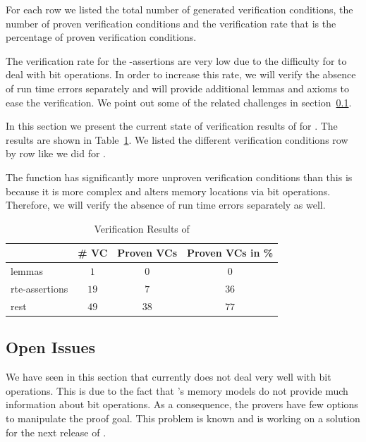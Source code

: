 For each row we listed the total number of generated verification conditions,
the number of proven verification conditions and the verification rate
that is the percentage of proven verification conditions. 

The verification rate for the -assertions are very low 
due to the difficulty for \framac to deal with bit operations.
In order to increase this rate, we will verify the absence
of run time errors separately and will provide additional lemmas and axioms
to ease the verification.
We point out some of the related challenges in section~\ref{issues}.



In this section we present the current state of verification results of 
for \poke.
The results are shown in Table~\ref{tab:results-poke}.
 We listed the different verification conditions 
 row by row like we did for \peek.

The function \poke has significantly more unproven verification conditions than \peek
this is because it is more complex and alters memory locations via bit operations.
Therefore, we will verify the absence of run time errors separately as well.

\begin{table}[hbt]
  \centering
  \begin{tabular}[h]{lccc}
    \toprule
     & \# VC & Proven VCs & Proven VCs in \%\\
    \midrule
    lemmas & $1$ &$0$ & $0$ \\
    rte-assertions&$19$&$7$&$36$\\
    rest &$49$ &$38$&$77$\\
    \bottomrule
  \end{tabular}
  \caption{Verification Results of \poke}
  \label{tab:results-poke}
\end{table}

\clearpage

\subsection{Open Issues}
\label{issues}



We have seen in this section that \wpframac currently does not deal very well with bit operations.
This is due to the fact that \wpframac's memory models do not provide 
much information about bit operations.
As a consequence, the provers have few options to manipulate the proof goal.
This problem is known and \cealist is working on a solution for the next release of \wpframac.

